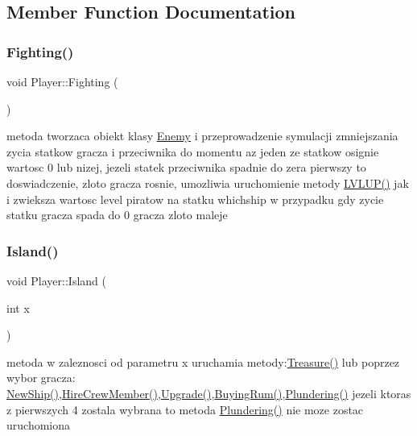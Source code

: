 \subsection{Member Function Documentation}
\mbox{\label{class_player_aea0f1b80c9c3e2ea3beede26b9b2b51a}} 
\subsubsection{\texorpdfstring{Fighting()}{Fighting()}}
{\footnotesize\ttfamily void Player\+::\+Fighting (\begin{DoxyParamCaption}{ }\end{DoxyParamCaption})}

metoda tworzaca obiekt klasy \hyperlink{class_enemy}{Enemy} i przeprowadzenie symulacji zmniejszania zycia statkow gracza i przeciwnika do momentu az jeden ze statkow osignie wartosc 0 lub nizej, jezeli statek przeciwnika spadnie do zera pierwszy to doswiadczenie, zloto gracza rosnie, umozliwia uruchomienie metody \hyperlink{class_player_af9c0820574406f3d4db31bf006aa368d}{L\+V\+L\+U\+P()} jak i zwieksza wartosc level piratow na statku whichship w przypadku gdy zycie statku gracza spada do 0 gracza zloto maleje \mbox{\label{class_player_afc2b87dc8abe8dfc5ea7f62503e18810}} 
\subsubsection{\texorpdfstring{Island()}{Island()}}
{\footnotesize\ttfamily void Player\+::\+Island (\begin{DoxyParamCaption}\item[{int}]{x }\end{DoxyParamCaption})}

metoda w zaleznosci od parametru x uruchamia metody\+:\hyperlink{class_player_adeae433538eda671f1cbaaf3fce54380}{Treasure()} lub poprzez wybor gracza\+: \hyperlink{class_player_a235e967a3d74eeb64f983cf8a6db3272}{New\+Ship()},\hyperlink{class_player_a9a4c059e7aa94a6ee4152351af9d9edd}{Hire\+Crew\+Member()},\hyperlink{class_player_af928618a2b86138724fe0a523d8aa213}{Upgrade()},\hyperlink{class_player_a9a02542fcb29f6facb130883cfb1bbed}{Buying\+Rum()},\hyperlink{class_player_ac2310aba7bab5049f6ff4c7b3392566e}{Plundering()} jezeli ktoras z pierwszych 4 zostala wybrana to metoda \hyperlink{class_player_ac2310aba7bab5049f6ff4c7b3392566e}{Plundering()} nie moze zostac uruchomiona \mbox{\label{class_player_a254328ae8a844fcbc54fe6f159e02131}} 
